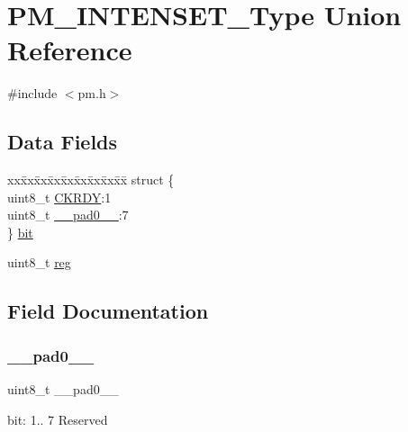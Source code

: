\hypertarget{union_p_m___i_n_t_e_n_s_e_t___type}{}\section{P\+M\+\_\+\+I\+N\+T\+E\+N\+S\+E\+T\+\_\+\+Type Union Reference}
\label{union_p_m___i_n_t_e_n_s_e_t___type}


{\ttfamily \#include $<$pm.\+h$>$}

\subsection*{Data Fields}
\begin{DoxyCompactItemize}
\item 
\begin{tabbing}
xx\=xx\=xx\=xx\=xx\=xx\=xx\=xx\=xx\=\kill
struct \{\\
\>uint8\_t \mbox{\hyperlink{union_p_m___i_n_t_e_n_s_e_t___type_adbe5f3203d63c6431c43561e9fed6517}{CKRDY}}:1\\
\>uint8\_t \mbox{\hyperlink{union_p_m___i_n_t_e_n_s_e_t___type_a8b4eebe79ded0459acec2f4950102ba3}{\_\_pad0\_\_}}:7\\
\} \mbox{\hyperlink{union_p_m___i_n_t_e_n_s_e_t___type_a782b2ff01c1b7fa0256a718d953cb393}{bit}}\\

\end{tabbing}\item 
uint8\+\_\+t \mbox{\hyperlink{union_p_m___i_n_t_e_n_s_e_t___type_a9428adc9af4653a2050e2536b55dec8d}{reg}}
\end{DoxyCompactItemize}


\subsection{Field Documentation}
\mbox{\label{union_p_m___i_n_t_e_n_s_e_t___type_a8b4eebe79ded0459acec2f4950102ba3}} 
\subsubsection{\texorpdfstring{\_\_pad0\_\_}{\_\_pad0\_\_}}
{\footnotesize\ttfamily uint8\+\_\+t \+\_\+\+\_\+pad0\+\_\+\+\_\+}

bit\+: 1.. 7 Reserved \mbox{\label{union_p_m___i_n_t_e_n_s_e_t___type_a782b2ff01c1b7fa0256a718d953cb393}} 
